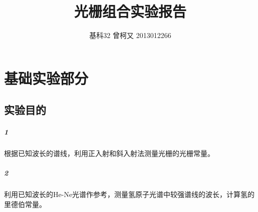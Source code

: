 \documentclass[11pt,a4paper]{ctexart}
\title{光栅组合实验报告}
\author{基科32 曾柯又 2013012266}
\date{\vspace{-5ex}}
\begin{document}
	\chapter{基础实验部分}
	\section{实验目的}
	\paragraph{1}根据已知波长的谱线，利用正入射和斜入射法测量光栅的光栅常量。
	\paragraph{2}利用已知波长的He-Ne光谱作参考，测量氢原子光谱中较强谱线的波长，计算氢的里德伯常量。
\end{document}
